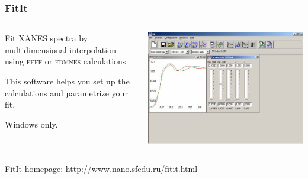 \documentclass[10pt, xcolor=x11names, compress]{beamer}
\begin{document}
\begin{frame}
  \frametitle{FitIt}
  \begin{columns}
    \begin{column}{0.5\linewidth}
      Fit XANES spectra by multidimensional interpolation using
      \textsc{feff} or \textsc{fdmnes} calculations.

      \smallskip

      This software helps you set up the calculations and parametrize
      your fit.

      \smallskip

      Windows only.
    \end{column}
    \begin{column}{0.5\linewidth}
      \includegraphics[width=0.9\linewidth]{images/fitit_2.jpg}      
    \end{column}
  \end{columns}

  \bigskip

  \href{http://www.nano.sfedu.ru/fitit.html}
  {\color{Blue4}FitIt homepage: http://www.nano.sfedu.ru/fitit.html}
\end{frame}
\end{document}
